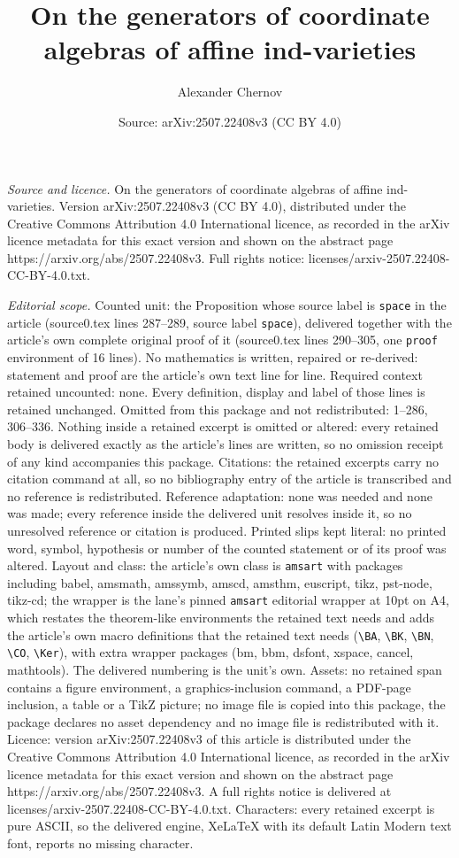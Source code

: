 \documentclass[10pt,a4paper]{amsart}
\title[On the generators of coordinate algebras of affine ind-varie]{On the generators of coordinate algebras of affine ind-varieties}
\author{Alexander Chernov}
\date{Source: arXiv:2507.22408v3 (CC BY 4.0)}
\begin{document}
\maketitle

\noindent\emph{Source and licence.} On the generators of coordinate algebras of affine ind-varieties. Version arXiv:2507.22408v3 (CC BY 4.0), distributed under the Creative Commons Attribution 4.0 International licence, as recorded in the arXiv licence metadata for this exact version and shown on the abstract page https://arxiv.org/abs/2507.22408v3. Full rights notice: licenses/arxiv-2507.22408-CC-BY-4.0.txt.\par\smallskip

\noindent\textit{Editorial scope.} Counted unit: the Proposition whose source label is \texttt{space} in the article (source0.tex lines 287--289, source label \texttt{space}), delivered together with the article's own complete original proof of it (source0.tex lines 290--305, one \texttt{proof} environment of 16 lines). No mathematics is written, repaired or re-derived: statement and proof are the article's own text line for line. Required context retained uncounted: none. Every definition, display and label of those lines is retained unchanged. Omitted from this package and not redistributed: 1--286, 306--336. Nothing inside a retained excerpt is omitted or altered: every retained body is delivered exactly as the article's lines are written, so no omission receipt of any kind accompanies this package. Citations: the retained excerpts carry no citation command at all, so no bibliography entry of the article is transcribed and no reference is redistributed. Reference adaptation: none was needed and none was made; every reference inside the delivered unit resolves inside it, so no unresolved reference or citation is produced. Printed slips kept literal: no printed word, symbol, hypothesis or number of the counted statement or of its proof was altered. Layout and class: the article's own class is \texttt{amsart} with packages including babel, amsmath, amssymb, amscd, amsthm, euscript, tikz, pst-node, tikz-cd; the wrapper is the lane's pinned \texttt{amsart} editorial wrapper at 10pt on A4, which restates the theorem-like environments the retained text needs and adds the article's own macro definitions that the retained text needs (\texttt{\textbackslash BA}, \texttt{\textbackslash BK}, \texttt{\textbackslash BN}, \texttt{\textbackslash CO}, \texttt{\textbackslash Ker}), with extra wrapper packages (bm, bbm, dsfont, xspace, cancel, mathtools). The delivered numbering is the unit's own. Assets: no retained span contains a figure environment, a graphics-inclusion command, a PDF-page inclusion, a table or a TikZ picture; no image file is copied into this package, the package declares no asset dependency and no image file is redistributed with it. Licence: version arXiv:2507.22408v3 of this article is distributed under the Creative Commons Attribution 4.0 International licence, as recorded in the arXiv licence metadata for this exact version and shown on the abstract page https://arxiv.org/abs/2507.22408v3. A full rights notice is delivered at licenses/arxiv-2507.22408-CC-BY-4.0.txt. Characters: every retained excerpt is pure ASCII, so the delivered engine, XeLaTeX with its default Latin Modern text font, reports no missing character.
\end{document}
